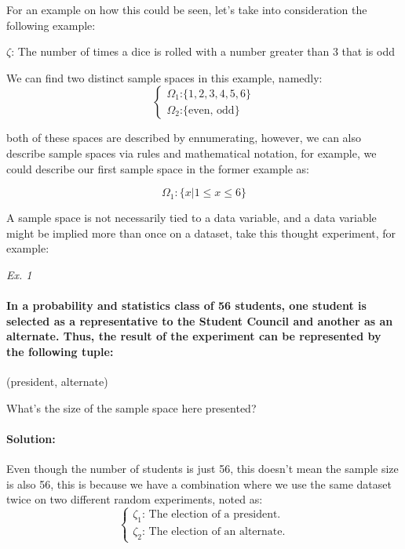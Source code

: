 \documentclass[11pt,fleqn]{book} %
\begin{document}
For an example on how this could be seen, let's take into consideration the following example:

$ \zeta $: The number of times a dice is rolled with a number greater than 3 that is odd

We can find two distinct sample spaces in this example, namedly:
$$
\begin{cases}
    \Omega_1 \text{:} \{ 1,2,3,4,5,6 \} \\
    \Omega_2 \text{:} \{ \text{even, odd} \}    
\end{cases}
$$

both of these spaces are described by ennumerating, however, we can also describe sample spaces via rules and mathematical notation,
for example, we could describe our first sample space in the former example as:

$$ \Omega_1: \{ x | 1 \le x \le 6 \} $$

A sample space is not necessarily tied to a data variable, and a data variable might be implied more than once on a dataset,
take this thought experiment, for example:

\textit{Ex. 1}

\paragraph*{In a probability and statistics class of 56 students, one 
student is selected as a representative to the Student Council and 
another as an alternate. Thus, the result of the experiment can be 
represented by the following tuple:}

\begin{center}
    (president, alternate)    
\end{center}

What's the size of the sample space here presented?

\paragraph{Solution:}

Even though the number of students is just 56, this doesn't mean the sample size is also
56, this is because we have a combination where we use the same dataset twice on two 
different random experiments, noted as:
$$
\begin{cases}
    \zeta_1 \text{: The election of a president.}\\
    \zeta_2 \text{: The election of an alternate.}
\end{cases}
$$
\end{document}
